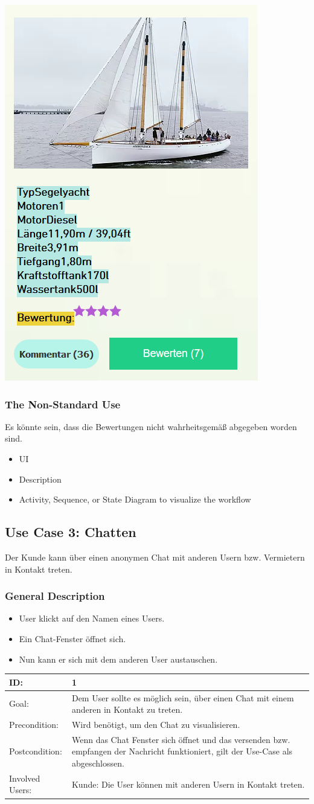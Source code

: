 \documentclass[12pt]{article}
\theoremstyle{definition}
\begin{document}
\includegraphics[height=0.40\textwidth]{Bewerten.PNG}

\subsubsection{The Non-Standard Use}
Es könnte sein, dass die Bewertungen nicht wahrheitsgemäß abgegeben worden sind.
\begin{itemize}
	\item UI
	\item Description
	\item Activity, Sequence, or State Diagram to visualize the workflow
\end{itemize}
\pagebreak

\subsection{Use Case 3: Chatten}
Der Kunde kann über einen anonymen Chat mit anderen Usern bzw. Vermietern in Kontakt treten.
\subsubsection{General Description}
	\begin{itemize}
		\item User klickt auf den Namen eines Users.
		\item Ein Chat-Fenster öffnet sich.
		\item Nun kann er sich mit dem anderen User austauschen.
	\end{itemize}

\begin{tabular}{|p{.2\linewidth}|p{.65\linewidth}|}
\hline 
ID: & 1 \\ \hline
Goal: & Dem User sollte es möglich sein, über einen Chat mit einem anderen in Kontakt zu treten. \\ \hline
Precondition: & Wird benötigt, um den Chat zu visualisieren. \\ \hline
Postcondition: & Wenn das Chat Fenster sich öffnet und das versenden bzw. empfangen der Nachricht funktioniert, gilt der Use-Case als abgeschlossen. \\ \hline
Involved Users: &Kunde: Die User können mit anderen Usern in Kontakt treten. \\ \hline
\end{tabular}
\end{document}
